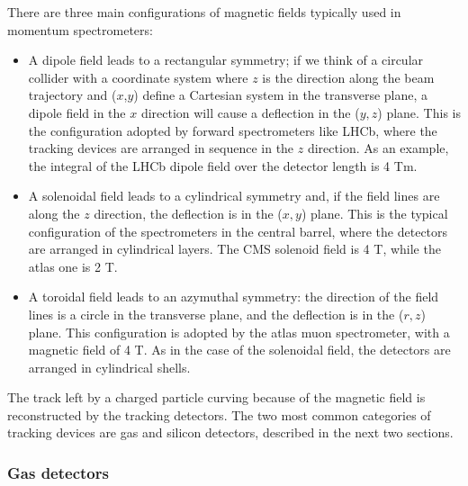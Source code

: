 There are three main configurations of magnetic fields typically used in momentum spectrometers:
\begin{itemize}
\item A dipole field leads to a rectangular symmetry; if we think of a circular collider with a coordinate system where $z$ is the direction along the beam trajectory and ($x$,$y$) define a Cartesian system in the transverse plane, a dipole  field in the $x$ direction will cause a deflection in the ($y,z$) plane. This is the configuration adopted by forward spectrometers like LHCb, where the tracking devices are arranged in sequence in the $z$ direction. As an example, the integral of the LHCb dipole field over the detector length is 4 Tm.

\item A solenoidal field leads to a cylindrical symmetry and, if the field lines are along the $z$ direction, the deflection is in the ($x,y$) plane. This is the typical configuration of the spectrometers in the central barrel, where the detectors are arranged in cylindrical layers. The CMS solenoid field is 4 T, while the \gls{atlas} one is 2 T. 

\item A toroidal field leads to an azymuthal symmetry: the direction of the field lines is a circle in the transverse plane, and the deflection is in the ($r,z$) plane. This configuration is adopted by the \gls{atlas} muon spectrometer, with a magnetic field of 4 T. As in the case of the solenoidal field, the detectors are arranged in cylindrical shells.
\end{itemize}

The track left by a charged particle curving because of the magnetic field is reconstructed by the tracking detectors. The two most common categories of tracking devices are gas and silicon detectors, described in the next two sections.

\subsubsection*{Gas detectors}

